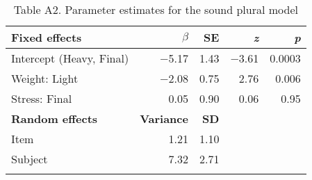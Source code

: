\documentclass[output=paper]{langsci/langscibook}
\begin{document}
\clearpage 
\begin{table}
\begin{tabularx}{\textwidth}{X rrrr}
\lsptoprule
\textbf{Fixed effects} & \bfseries $\beta $ & \textbf{SE} & \textbf{\textit{z}} & \textbf{\textit{p}}\\
\midrule 
Intercept (Heavy, Final) &$-$5.17 & 1.43 &$-$3.61 & 0.0003\\
Weight: Light &$-$2.08 & 0.75 &2.76 & 0.006\\
Stress: Final &0.05 & 0.90 &0.06 & 0.95\\
\tablevspace
\midrule
\textbf{Random effects} & \textbf{Variance} & \textbf{SD} &  & \\
\midrule
Item & 1.21 & 1.10 &  & \\
Subject & 7.32 & 2.71 &  & \\
\lspbottomrule
\end{tabularx}
\caption{Table A2. Parameter estimates for the sound plural model}
\end{table}


  
 
 
 
\sloppy
\printbibliography[heading=subbibliography,notkeyword=this] 
\end{document}
